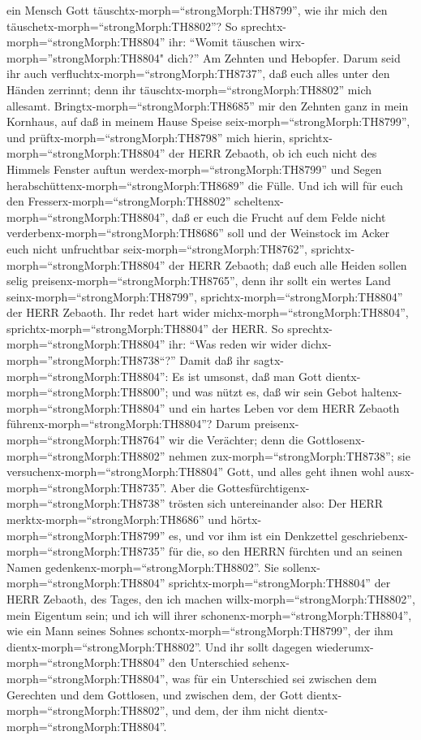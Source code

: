 ein Mensch Gott täuschtx-morph=``strongMorph:TH8799'', wie ihr mich den
täuschetx-morph=``strongMorph:TH8802''? So
sprechtx-morph=``strongMorph:TH8804'' ihr: ``Womit täuschen
wirx-morph=''strongMorph:TH8804" dich?'' Am Zehnten und Hebopfer.
 Darum seid ihr auch
verfluchtx-morph=``strongMorph:TH8737'', daß euch alles unter den Händen
zerrinnt; denn ihr täuschtx-morph=``strongMorph:TH8802'' mich allesamt.
 Bringtx-morph=``strongMorph:TH8685'' mir den Zehnten ganz
in mein Kornhaus, auf daß in meinem Hause Speise
seix-morph=``strongMorph:TH8799'', und
prüftx-morph=``strongMorph:TH8798'' mich hierin,
sprichtx-morph=``strongMorph:TH8804'' der HERR Zebaoth, ob ich euch
nicht des Himmels Fenster auftun werdex-morph=``strongMorph:TH8799'' und
Segen herabschüttenx-morph=``strongMorph:TH8689'' die Fülle.
 Und ich will für euch den
Fresserx-morph=``strongMorph:TH8802''
scheltenx-morph=``strongMorph:TH8804'', daß er euch die Frucht auf dem
Felde nicht verderbenx-morph=``strongMorph:TH8686'' soll und der
Weinstock im Acker euch nicht unfruchtbar
seix-morph=``strongMorph:TH8762'', sprichtx-morph=``strongMorph:TH8804''
der HERR Zebaoth;  daß euch alle Heiden sollen selig
preisenx-morph=``strongMorph:TH8765'', denn ihr sollt ein wertes Land
seinx-morph=``strongMorph:TH8799'',
sprichtx-morph=``strongMorph:TH8804'' der HERR Zebaoth. 
Ihr redet hart wider michx-morph=``strongMorph:TH8804'',
sprichtx-morph=``strongMorph:TH8804'' der HERR. So
sprechtx-morph=``strongMorph:TH8804'' ihr: ``Was reden wir wider
dichx-morph=''strongMorph:TH8738``?''  Damit daß ihr
sagtx-morph=``strongMorph:TH8804'': Es ist umsonst, daß man Gott
dientx-morph=``strongMorph:TH8800''; und was nützt es, daß wir sein
Gebot haltenx-morph=``strongMorph:TH8804'' und ein hartes Leben vor dem
HERR Zebaoth führenx-morph=``strongMorph:TH8804''?  Darum
preisenx-morph=``strongMorph:TH8764'' wir die Verächter; denn die
Gottlosenx-morph=``strongMorph:TH8802'' nehmen
zux-morph=``strongMorph:TH8738''; sie
versuchenx-morph=``strongMorph:TH8804'' Gott, und alles geht ihnen wohl
ausx-morph=``strongMorph:TH8735''.  Aber die
Gottesfürchtigenx-morph=``strongMorph:TH8738'' trösten sich
untereinander also: Der HERR merktx-morph=``strongMorph:TH8686'' und
hörtx-morph=``strongMorph:TH8799'' es, und vor ihm ist ein Denkzettel
geschriebenx-morph=``strongMorph:TH8735'' für die, so den HERRN fürchten
und an seinen Namen gedenkenx-morph=``strongMorph:TH8802''.
 Sie sollenx-morph=``strongMorph:TH8804''
sprichtx-morph=``strongMorph:TH8804'' der HERR Zebaoth, des Tages, den
ich machen willx-morph=``strongMorph:TH8802'', mein Eigentum sein; und
ich will ihrer schonenx-morph=``strongMorph:TH8804'', wie ein Mann
seines Sohnes schontx-morph=``strongMorph:TH8799'', der ihm
dientx-morph=``strongMorph:TH8802''.  Und ihr sollt dagegen
wiederumx-morph=``strongMorph:TH8804'' den Unterschied
sehenx-morph=``strongMorph:TH8804'', was für ein Unterschied sei
zwischen dem Gerechten und dem Gottlosen, und zwischen dem, der Gott
dientx-morph=``strongMorph:TH8802'', und dem, der ihm nicht
dientx-morph=``strongMorph:TH8804''.

